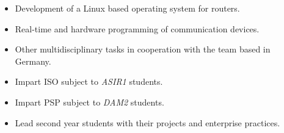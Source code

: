 \documentclass[10pt,a4paper,ragged2e]{altacv}
\begin{document}

\begin{fullwidth}
\makecvheader
\end{fullwidth}



\begin{itemize}
  \item Development of a Linux based operating system for routers.
  \item Real-time and hardware programming of communication devices.
  \item Other multidisciplinary tasks in cooperation with the team based in Germany.
\end{itemize}
\divider

\begin{itemize}
  \item Impart ISO subject to \textit{ASIR1} students.
  \item Impart PSP subject to \textit{DAM2} students.
  \item Lead second year students with their projects and enterprise practices.
\end{itemize}
\divider
\end{document}
